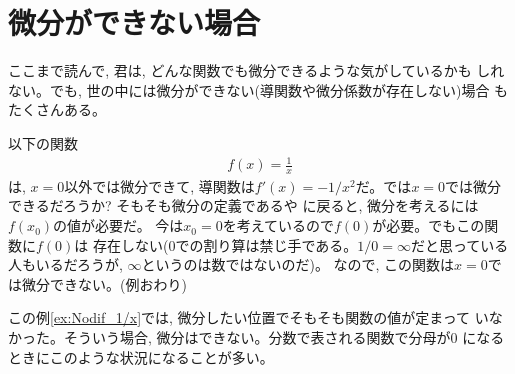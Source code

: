 \section{微分ができない場合}

ここまで読んで, 君は, どんな関数でも微分できるような気がしているかも
しれない。でも, 世の中には微分ができない(導関数や微分係数が存在しない)場合
もたくさんある。

\begin{exmpl}\label{ex:Nodif_1/x} 以下の関数
\begin{eqnarray}f(x)=\frac{1}{x}\end{eqnarray}
は, $x=0$以外では微分できて, 導関数は$f'(x)=-1/x^2$だ。では$x=0$では微分
できるだろうか? そもそも微分の定義であるや
に戻ると, 微分を考えるには$f(x_0)$の値が必要だ。
今は$x_0=0$を考えているので$f(0)$が必要。でもこの関数に$f(0)$は
存在しない(0での割り算は禁じ手である。$1/0=\infty$だと思っている
人もいるだろうが, $\infty$というのは数ではないのだ)。
なので, この関数は$x=0$では微分できない。(例おわり)
\end{exmpl}

この例\ref{ex:Nodif_1/x}では, 微分したい位置でそもそも関数の値が定まって
いなかった。そういう場合, 微分はできない。分数で表される関数で分母が0
になるときにこのような状況になることが多い。

